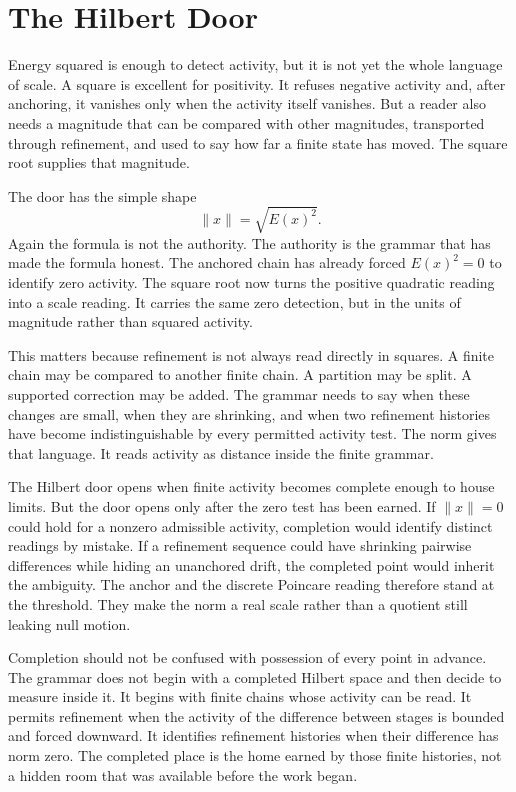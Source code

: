 \section{The Hilbert Door}

Energy squared is enough to detect activity, but it is not yet the whole
language of scale. A square is excellent for positivity. It refuses negative
activity and, after anchoring, it vanishes only when the activity itself
vanishes. But a reader also needs a magnitude that can be compared with
other magnitudes, transported through refinement, and used to say how far a
finite state has moved. The square root supplies that magnitude.

The door has the simple shape
\[
  \|x\| = \sqrt{E(x)^2}.
\]
Again the formula is not the authority. The authority is the grammar that
has made the formula honest. The anchored chain has already forced
\(E(x)^2=0\) to identify zero activity. The square root now turns the
positive quadratic reading into a scale reading. It carries the same zero
detection, but in the units of magnitude rather than squared activity.

This matters because refinement is not always read directly in squares. A
finite chain may be compared to another finite chain. A partition may be
split. A supported correction may be added. The grammar needs to say when
these changes are small, when they are shrinking, and when two refinement
histories have become indistinguishable by every permitted activity test.
The norm gives that language. It reads activity as distance inside the
finite grammar.

The Hilbert door opens when finite activity becomes complete enough to house
limits. But the door opens only after the zero test has been earned. If
\(\|x\|=0\) could hold for a nonzero admissible activity, completion would
identify distinct readings by mistake. If a refinement sequence could have
shrinking pairwise differences while hiding an unanchored drift, the
completed point would inherit the ambiguity. The anchor and the discrete
Poincare reading therefore stand at the threshold. They make the norm a real
scale rather than a quotient still leaking null motion.

Completion should not be confused with possession of every point in advance.
The grammar does not begin with a completed Hilbert space and then decide to
measure inside it. It begins with finite chains whose activity can be read.
It permits refinement when the activity of the difference between stages is
bounded and forced downward. It identifies refinement histories when their
difference has norm zero. The completed place is the home earned by those
finite histories, not a hidden room that was available before the work began.

